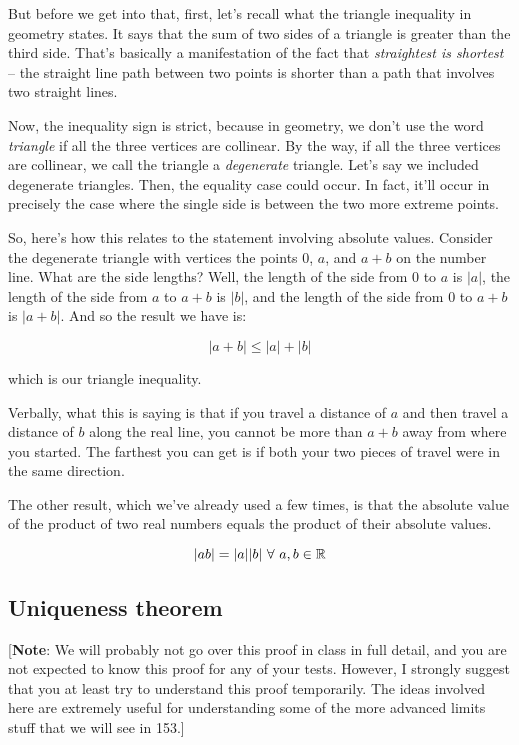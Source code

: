 \documentclass[10pt]{amsart}
\begin{document}
But before we get into that, first, let's recall what the triangle
inequality in geometry states. It says that the sum of two sides of a
triangle is greater than the third side. That's basically a
manifestation of the fact that {\em straightest is shortest} -- the
straight line path between two points is shorter than a path that
involves two straight lines.

Now, the inequality sign is strict, because in geometry, we don't use
the word {\em triangle} if all the three vertices are collinear. By
the way, if all the three vertices are collinear, we call the triangle
a {\em degenerate} triangle. Let's say we included degenerate
triangles. Then, the equality case could occur. In fact, it'll occur
in precisely the case where the single side is between the two more
extreme points.

So, here's how this relates to the statement involving absolute
values. Consider the degenerate triangle with vertices the points $0$,
$a$, and $a + b$ on the number line. What are the side lengths? Well,
the length of the side from $0$ to $a$ is $|a|$, the length of the
side from $a$ to $a + b$ is $|b|$, and the length of the side from $0$
to $a + b$ is $|a + b|$. And so the result we have is:

$$|a + b| \le |a| + |b|$$

which is our triangle inequality.

Verbally, what this is saying is that if you travel a distance of $a$
and then travel a distance of $b$ along the real line, you cannot be
more than $a + b$ away from where you started. The farthest you can
get is if both your two pieces of travel were in the same direction.

The other result, which we've already used a few times, is that the
absolute value of the product of two real numbers equals the product
of their absolute values.

\begin{equation*}
  |ab| = |a||b| \ \forall \ a,b \in \mathbb{R}
\end{equation*}

\subsection{Uniqueness theorem}

[{\bf Note}: We will probably not go over this proof in class in full
detail, and you are not expected to know this proof for any of your
tests. However, I strongly suggest that you at least try to understand
this proof temporarily. The ideas involved here are extremely useful
for understanding some of the more advanced limits stuff that we will
see in 153.]
\end{document}
